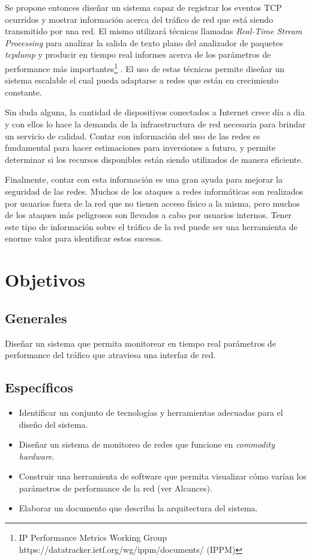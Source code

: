 Se propone entonces diseñar un sistema capaz de registrar los eventos TCP ocurridos y mostrar información acerca del tráfico de red que está siendo transmitido por una red. El mismo utilizará técnicas llamadas \textit{Real-Time Stream Processing} para analizar la salida de texto plano del analizador de paquetes \textit{tcpdump} y producir en tiempo real informes acerca de los parámetros de performance más importantes\footnote{IP Performance Metrics Working Group https://datatracker.ietf.org/wg/ippm/documents/ (IPPM)}
. El uso de estas técnicas permite diseñar un sistema escalable el cual pueda adaptarse a redes que están en crecimiento constante.

Sin duda alguna, la cantidad de dispositivos conectados a Internet crece día a día y con ellos lo hace la demanda de la infraestructura de red necesaria para brindar un servicio de calidad. Contar con información del uso de las redes es fundamental para hacer estimaciones para inversiones a futuro, y permite determinar si los recursos disponibles están siendo utilizados de manera eficiente.

Finalmente, contar con esta información es una gran ayuda para mejorar la seguridad de las redes. Muchos de los ataques a redes informáticas son realizados por usuarios fuera de la red que no tienen acceso físico a la misma, pero muchos de los ataques más peligrosos son llevados a cabo por usuarios internos. Tener este tipo de información sobre el tráfico de la red puede ser una herramienta de enorme valor para identificar estos sucesos.

\section*{Objetivos}
\subsection*{Generales}
Diseñar un sistema que permita monitorear en tiempo real parámetros de performance del tráfico que atraviesa una interfaz de red.
\subsection*{Específicos}
\begin{itemize}

\item Identificar un conjunto de tecnologías y herramientas adecuadas para el diseño del sistema.
\item Diseñar un sistema de monitoreo de redes que funcione en \textit{commodity hardware}.
\item Construir una herramienta de software que permita visualizar cómo varían los parámetros de performance de la red (ver Alcances).
\item Elaborar un documento que describa la arquitectura del sistema.
\end{itemize}


